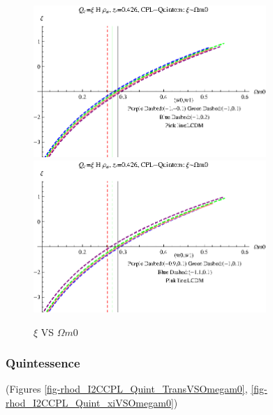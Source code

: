 \documentclass[12pt,a4paper]{article}
\begin{document}
\begin{figure}
\centering
\includegraphics[width=250pt]{rhod_I2CCPL_Quintom_xiVSOmegam01.eps}
\includegraphics[width=250pt]{rhod_I2CCPL_Quintom_xiVSOmegam02.eps}
\caption{$\xi$ VS $\Omega m0$}\label{fig-rhod_I2CCPL_Quintom_xiVSOmegam0}
\end{figure}



\subsubsection{Quintessence}

(Figures \ref{fig-rhod_I2CCPL_Quint_TransVSOmegam0}, \ref{fig-rhod_I2CCPL_Quint_xiVSOmegam0})
\end{document}
